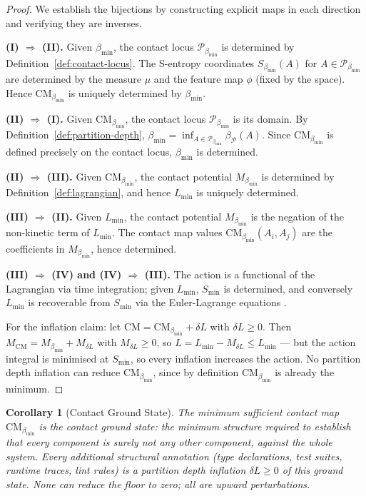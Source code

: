 \documentclass[12pt,a4paper,twocolumn]{article}
\theoremstyle{plain}
\newtheorem{corollary}[theorem]{Corollary}
\theoremstyle{definition}
\theoremstyle{remark}
\newcommand{\Part}{\mathcal{P}}
\newcommand{\CM}{\mathrm{CM}}
\newcommand{\bmin}{\beta_{\min}}
\newcommand{\bP}{\beta_{\mathcal{P}}}
\newcommand{\Lmin}{L_{\min}}
\newcommand{\Smin}{S_{\min}}
\newcommand{\CMbmin}{\CM_{\bmin}}
\newcommand{\Sbmin}{S_{\bmin}}
\begin{document}
\begin{proof}
We establish the bijections by constructing explicit maps in each direction
and verifying they are inverses.

\textbf{(I) $\Rightarrow$ (II).}  Given $\bmin$, the contact locus
$\Part_{\bmin}$ is determined by Definition~\ref{def:contact-locus}.  The
S-entropy coordinates $\Sbmin(A)$ for $A \in \Part_{\bmin}$ are determined
by the measure $\mu$ and the feature map $\phi$ (fixed by the space).  Hence
$\CMbmin$ is uniquely determined by $\bmin$.

\textbf{(II) $\Rightarrow$ (I).}  Given $\CMbmin$, the contact locus
$\Part_{\bmin}$ is its domain.  By Definition~\ref{def:partition-depth},
$\bmin = \inf_{A \in \Part_{\bmin}} \bP(A)$.  Since $\CMbmin$ is defined
precisely on the contact locus, $\bmin$ is determined.

\textbf{(II) $\Rightarrow$ (III).}  Given $\CMbmin$, the contact potential
$M_{\bmin}$ is determined by Definition~\ref{def:lagrangian}, and hence
$\Lmin$ is uniquely determined.

\textbf{(III) $\Rightarrow$ (II).}  Given $\Lmin$, the contact potential
$M_{\bmin}$ is the negation of the non-kinetic term of $\Lmin$.  The
contact map values $\CMbmin(A_i,A_j)$ are the coefficients in $M_{\bmin}$,
hence determined.

\textbf{(III) $\Rightarrow$ (IV) and (IV) $\Rightarrow$ (III).}  The action
is a functional of the Lagrangian via time integration; given $\Lmin$, $\Smin$
is determined, and conversely $\Lmin$ is recoverable from $\Smin$ via the
Euler-Lagrange equations \citep{goldstein2002classical, arnold1989mathematical}.

For the inflation claim: let $\CM = \CMbmin + \delta L$ with $\delta L \geq
0$.  Then $M_\CM = M_{\bmin} + M_{\delta L}$ with $M_{\delta L} \geq 0$,
so $L = \Lmin - M_{\delta L} \leq \Lmin$ --- but the action integral is
minimised at $\Smin$, so every inflation increases the action.  No partition
depth inflation can reduce $\CMbmin$, since by definition $\CMbmin$ is already
the minimum.
\end{proof}

\begin{corollary}[Contact Ground State]
\label{cor:ground-state}
The minimum sufficient contact map $\CMbmin$ is the \emph{contact ground
state}: the minimum structure required to establish that every component is
surely not any other component, against the whole system.  Every additional
structural annotation (type declarations, test suites, runtime traces,
lint rules) is a partition depth inflation $\delta L \geq 0$ of this ground
state.  None can reduce the floor to zero; all are upward perturbations.
\end{corollary}
\end{document}
